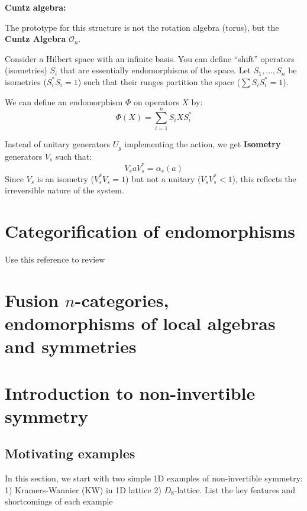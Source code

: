 \documentclass{article}
\theoremstyle{definition}
\begin{document}
  {\bf Cuntz algebra:}

  The prototype for this structure is not the rotation algebra (torus), but the \textbf{Cuntz
  Algebra} $\mathcal{O}_{n}$.

  Consider a Hilbert space with an infinite basis. You can define ``shift'' operators
  (isometries) $S_{i}$ that are essentially endomorphisms of the space. Let
  $S_{1}, \dots, S_{n}$ be isometries ($S_{i}^{*}S_{i}= 1$) such that their
  ranges partition the space ($\sum S_{i}S_{i}^{*}= 1$).

  We can define an endomorphism $\Phi$ on operators $X$ by:
  \begin{equation}
    \Phi(X) = \sum_{i=1}^{n}S_{i}X S_{i}^{*}
  \end{equation}

  Instead of unitary generators $U_{g}$ implementing the action, we get \textbf{Isometry}
  generators $V_{s}$ such that:
  \begin{equation}
    V_{s}a V_{s}^{*}= \alpha_{s}(a)
  \end{equation}
  Since $V_{s}$ is an isometry ($V_{s}^{*}V_{s}= 1$) but not a unitary ($V_{s}V_{s}
  ^{*}< 1$), this reflects the irreversible nature of the system.

  \section{Categorification of endomorphisms}

  Use this reference to review \cite{bischoff2015tensor}

  \section{Fusion $n$-categories, endomorphisms of local algebras and symmetries}

  \section{Introduction to non-invertible symmetry}


  \subsection{Motivating examples}

  In this section, we start with two simple 1D examples of non-invertible
  symmetry: 1) Kramers-Wannier (KW) in 1D lattice 2) $D_{8}$-lattice.
  \color{brown}
  List the key features and shortcomings of each example
\end{document}
